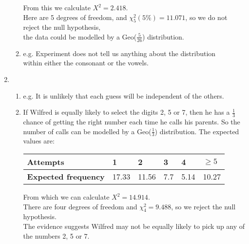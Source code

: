 \documentclass[fleqn]{article}
\begin{document}
\begin{enumerate}
\begin{enumerate}[label=\bfseries \alph*\space ]
                From this we calculate $X^2=2.418$.\\
                Here are 5 degrees of freedom, and $\chi_5^2(5\%)=11.071$, so we do not reject the null hypothesis, \\the data could be modelled by a Geo($\tfrac{5}{26}$) distribution.
            \item e.g. Experiment does not tell us anything about the distribution \\within either the consonant or the vowels.
        \end{enumerate}
    \item \begin{enumerate}[label=\bfseries \alph*\space ]
            \item e.g. It is unlikely that each guess will be independent of the others.
            \item If Wilfred is equally likely to select the digits 2, 5 or 7, then he has a $\tfrac{1}{3}$ chance of getting the right number each time he calls his parents. So the number of calls can be modelled by a Geo($\tfrac{1}{3}$) distribution. The expected values are: \vspace{2mm}\\
                \begin{tabularx}{0.65\textwidth}{|X|*5{P{12mm}|}}
                    \hline
                    \textbf{Attempts}             & 1     & 2     & 3   & 4    & $\geq5$     \\\hline
                    \textbf{Expected frequency}   & 17.33 & 11.56 & 7.7 & 5.14 & 10.27       \\\hline
                \end{tabularx}\vspace{4mm}
                
                From which we can calculate $X^2=14.914$. \\
                There are four degrees of freedom and $\chi_4^2=9.488$, so we reject the null hypothesis. \\
                The evidence suggests Wilfred may not be equally likely to pick up any of the numbers 2, 5 or 7.
        \end{enumerate}
\end{enumerate}
\end{document}
